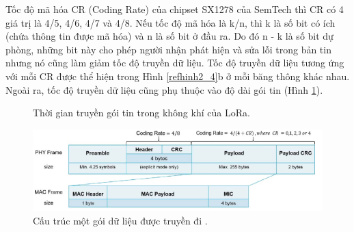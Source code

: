 \par 
Tốc độ mã hóa CR (Coding Rate) của chipset SX1278 của SemTech thì CR có 4 giá trị là 4/5, 4/6, 4/7 và 4/8. Nếu tốc độ mã hóa là k/n, thì k là số bit có ích (chứa thông tin được mã hóa) và n là số bit ở đầu ra. Do đó n - k là số bit dự phòng, những bit này cho phép người nhận phát hiện và sửa lỗi trong bản tin nhưng nó cũng làm giảm tốc độ truyền dữ liệu. Tốc độ truyền dữ liệu tương ứng với mỗi CR được thể hiện trong Hình \ref{refhinh2_4}{}b ở mỗi băng thông khác nhau. Ngoài ra, tốc độ truyền dữ liệu cũng phụ thuộc vào độ dài gói tin (Hình \ref{refhinh2_6}). \\
\begin{figure}[h]
\centering
{}\hfill
{}
\caption{Thời gian truyền gói tin trong không khí của LoRa. \cite{5}}
\label{refhinh2_6}
\end{figure} 
\begin{center}
    \begin{figure}[h]
    \begin{center}
     \includegraphics[scale=0.6]{image/hinh2_6}
    \end{center}
    \caption{Cấu trúc một gói dữ liệu được truyền đi \cite{5}.}
    \label{refhinh2_5}
    \end{figure}
\end{center}
